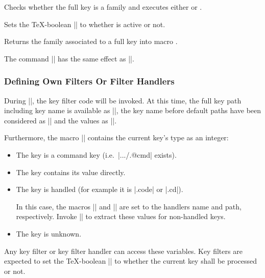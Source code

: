 \begin{command}{\pgfkeysiffamilydefined{}}%
    Checks whether the full key  is a family and executes either
     or .
\end{command}

\begin{command}{\pgfkeysisfamilyactive{}}
    Sets the \TeX-boolean |\ifpgfkeysfiltercontinue| to whether 
    is active or not.
\end{command}

\begin{command}{\pgfkeysgetfamily{}}
    Returns the family associated to a full key  into macro
    .
\end{command}

\begin{command}{\pgfkeyssetfamily{}}
    The command |\pgfkeyssetfamily| has the same
    effect as ||.
\end{command}


\subsubsection{Defining Own Filters Or Filter Handlers}
\label{section-key-writing-filters}

During |\pgfkeysfiltered|, the key filter code will be invoked. At this time,
the full key path including key name is available as |\pgfkeyscurrentkey|, the
key name before default paths have been considered as |\pgfkeyscurrentkeyRAW|
and the values as |\pgfkeyscurrentvalue|.

Furthermore, the macro |\pgfkeyscasenumber| contains the current key's type as
an integer:
%
\begin{itemize}
    \item[\meta{1}] The key is a command key (i.e.\ |.../.@cmd| exists).
    \item[\meta{2}] The key contains its value directly.
    \item[\meta{3}] The key is handled (for example it is |.code| or |.cd|).

        In this case, the macros |\pgfkeyscurrentname| and
        |\pgfkeyscurrentpath| are set to the handlers name and path,
        respectively. Invoke |\pgfkeyssplitpath{}| to extract these values for
        non-handled keys.
    \item[\meta{0}] The key is unknown.
\end{itemize}
%
Any key filter or key filter handler can access these variables. Key filters
are expected to set the \TeX-boolean |\ifpgfkeysfiltercontinue| to whether the
current key shall be processed or not.

